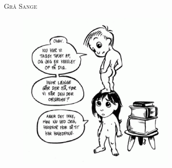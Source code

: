 \begin{center}
{\Huge\textsc{Grå Sange}}
\end{center}
\begin{figure}[h!]
  \centering
    \includegraphics[width=0.7\textwidth]{images/sex.eps}
\end{figure}
\newpage

\newpage



%

                                       
                   
   
    
